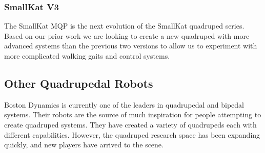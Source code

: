     \subsubsection{SmallKat V3}
    The SmallKat MQP is the next evolution of the SmallKat quadruped series. Based on our prior work we are looking to create a new quadruped with more advanced systems than the previous two versions to allow  us to experiment with more complicated walking gaits and control systems.

\subsection{Other Quadrupedal Robots}
Boston Dynamics is currently one of the leaders in quadrupedal and bipedal systems. Their robots are the source of much inspiration for people attempting to create quadruped systems. They have created a variety of quadrupeds each with different capabilities. However, the quadruped research space has been expanding quickly, and new players have arrived to the scene.
